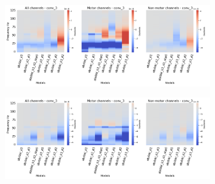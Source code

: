 \begin{figure}[!hpbp]
\begin{subfigure}[a]{\textwidth}
   \includegraphics[width=1\linewidth]{img/ch4/absVel-conv-3-layer-grads}
   \caption{}
\end{subfigure}\label{fig:absVel-conv-3-layer-grads}

\begin{subfigure}[b]{\textwidth}
   \includegraphics[width=1\linewidth]{img/ch4/absVel-conv-3-layer-grads-shifted}
   \caption{}
\end{subfigure}\label{fig:absVel-conv-3-layer-grads-shifted}
\caption[]{}
\end{figure}\label{fig:absVel-shifted-vs-non-shifted-grads}

